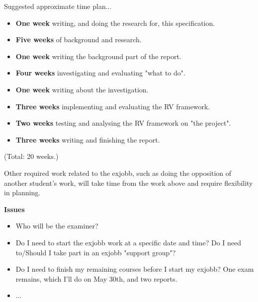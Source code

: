 \documentclass[a4paper,11pt]{kth-mag}
\begin{document}
Suggested approximate time plan...

\begin{itemize}
    \item \textbf{One week} writing, and doing the research for, this
        specification.
	\item \textbf{Five weeks} of background and research.
	\item \textbf{One week} writing the background part of the report.
	\item \textbf{Four weeks} investigating and evaluating "what to do".
	\item \textbf{One week} writing about the investigation.
	\item \textbf{Three weeks} implementing and evaluating the RV framework.
	\item \textbf{Two weeks} testing and analysing the RV framework on "the
        project".
	\item \textbf{Three weeks} writing and finishing the report.
\end{itemize}

(Total: 20 weeks.)

Other required work related to the exjobb, such as doing the opposition of
another student's work, will take time from the work above and require
flexibility in planning.

\textbf{Issues}

\begin{itemize}
	\item Who will be the examiner?
    \item Do I need to start the exjobb work at a specific date and time? Do I
        need to/Should I take part in an exjobb "support group"?
    \item Do I need to finish my remaining courses before I start my exjobb?
        One exam remains, which I'll do on May 30th, and two reports.
	\item ...
\end{itemize}
\end{document}
